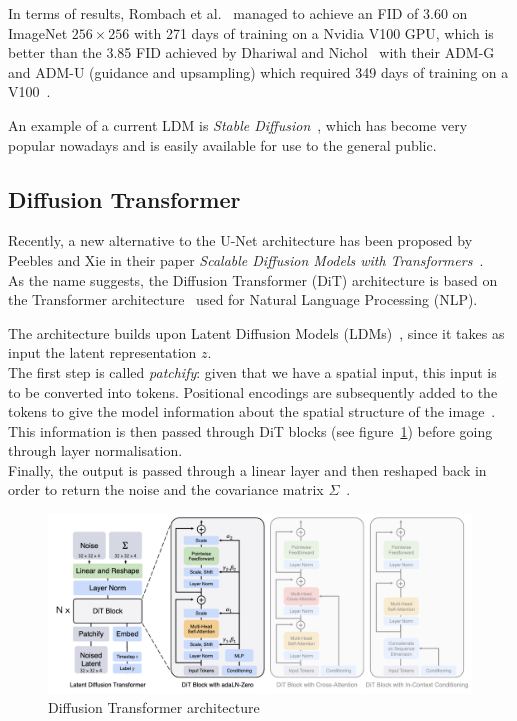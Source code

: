\documentclass[twoside]{article}
\numberwithin{equation}{section}
\numberwithin{figure}{section}
\begin{document}
In terms of results, Rombach et al.~\cite{rombach2022highresolution} managed to achieve an FID of 3.60 on ImageNet $256 \times 256$ with 271 days of training on a Nvidia V100 GPU, which is better than the 3.85 FID achieved by Dhariwal and Nichol~\cite{dhariwal2021diffusion} with their ADM-G and ADM-U (guidance and upsampling) which required 349 days of training on a V100~\cite{rombach2022highresolution}.

An example of a current LDM is \textit{Stable Diffusion}~\cite{stablediffusion, rombach2022highresolution}, which has become very popular nowadays and is easily available for use to the general public.

\subsection{Diffusion Transformer}
Recently, a new alternative to the U-Net architecture has been proposed by Peebles and Xie in their paper \textit{Scalable Diffusion Models with Transformers}~\cite{peebles2023scalable}. \\
As the name suggests, the Diffusion Transformer (DiT) architecture is based on the Transformer architecture~\cite{vaswani2023attention} used for Natural Language Processing (NLP).

The architecture builds upon Latent Diffusion Models (LDMs)~\cite{rombach2022highresolution}, since it takes as input the latent representation $z$. \\
The first step is called \textit{patchify}: given that we have a spatial input, this input is to be converted into tokens.
Positional encodings are subsequently added to the tokens to give the model information about the spatial structure of the image~\cite{peebles2023scalable}. \\
This information is then passed through DiT blocks (see figure~\ref{fig:DiT}) before going through layer normalisation. \\
Finally, the output is passed through a linear layer and then reshaped back in order to return the noise and the covariance matrix $\Sigma$~\cite{peebles2023scalable}.
\begin{figure}[h]
  \begin{center}
    \includegraphics[width=\textwidth]{images/DiT.png}
    \caption{Diffusion Transformer architecture~\cite{peebles2023scalable}}
    \label{fig:DiT}
  \end{center}
\end{figure}
\end{document}
